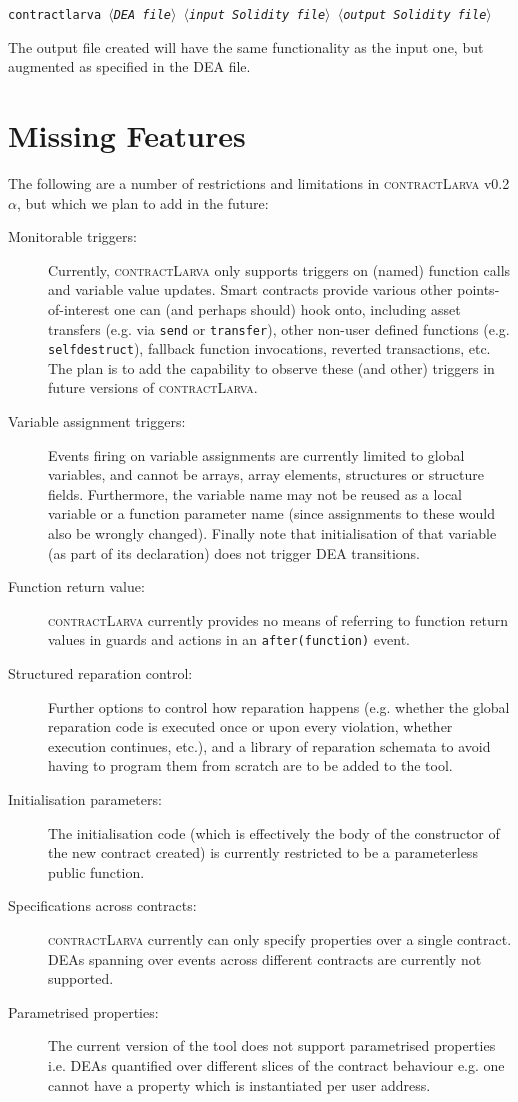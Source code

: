 \documentclass{article}
\newcommand{\contractlarva}{\textsc{contractLarva}\xspace}
\newcommand{\keyword}[1]{\textit{$\langle$#1$\rangle$}}
\begin{document}
  \smallskip\centerline{\texttt{contractlarva \keyword{DEA file} \keyword{input Solidity file} \keyword{output Solidity file}}}
  
  \smallskip The output file created will have the same functionality as the input one, but augmented as specified in the DEA file.
  
  \section{Missing Features}
  \label{s:extensions}
  The following are a number of restrictions and limitations in \contractlarva v0.2$\alpha$, but which we plan to add in the future:
  
  \begin{description}
    \item[Monitorable triggers:] Currently, \contractlarva only supports triggers on (named) function calls and variable value updates. Smart contracts provide various other points-of-interest one can (and perhaps should) hook onto, including asset transfers (e.g. via \texttt{send} or \texttt{transfer}), other non-user defined functions (e.g. \texttt{selfdestruct}), fallback function invocations, reverted transactions, etc. The plan is to add the capability to observe these (and other) triggers in future versions of \contractlarva.   
    \item[Variable assignment triggers:] Events firing on variable assignments are currently limited to global variables, and cannot be arrays, array elements, structures or structure fields. Furthermore, the variable name may not be reused as a local variable or a function parameter name (since assignments to these would also be wrongly changed). Finally note that initialisation of that variable (as part of its declaration) does not trigger DEA transitions.
    \item[Function return value:] \contractlarva currently provides no means of referring to function return values in guards and actions in an \texttt{after(function)} event.
    \item[Structured reparation control:] Further options to control how reparation happens (e.g. whether the global reparation code is executed once or upon every violation, whether execution continues, etc.), and a library of reparation schemata to avoid having to program them from scratch are to be added to the tool. 
    \item[Initialisation parameters:] The initialisation code (which is effectively the body of the constructor of the new contract created) is currently restricted to be a parameterless public function.
    \item[Specifications across contracts:] \contractlarva currently can only specify properties over a single contract. DEAs spanning over events across different contracts are currently not supported. 
    \item[Parametrised properties:] The current version of the tool does not support parametrised properties i.e. DEAs quantified over different slices of the contract behaviour e.g. one cannot have a property which is instantiated per user address. 
  \end{description}
  
\end{document}
